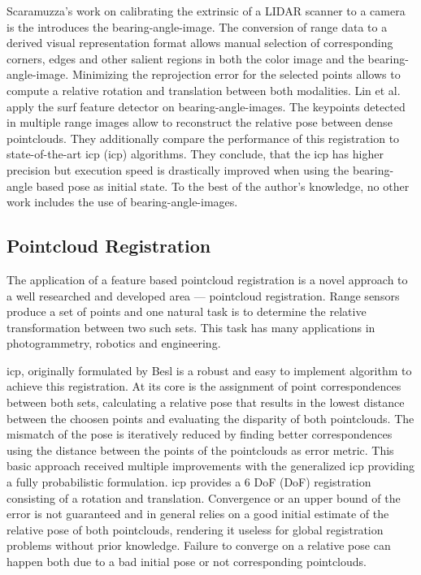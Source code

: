Scaramuzza's\cite{scaramuzza_iros2007} work on calibrating the extrinsic of a \acrshort{LIDAR} scanner to a camera is the introduces the \gls{bearing-angle-image}.
The conversion of range data to a derived visual representation format allows manual selection of corresponding corners, edges and other salient regions in both the color image and the \gls{bearing-angle-image}.
Minimizing the reprojection error for the selected points allows to compute a relative rotation and translation between both modalities.
Lin et al.\cite{lin_easp2017} apply the \acrshort{surf}\cite{bay_eccv06} feature detector on \glspl{bearing-angle-image}.
The keypoints detected in multiple range images allow to reconstruct the relative pose between dense pointclouds.
They additionally compare the performance of this registration to state-of-the-art \acrshort{icp} (\acrlong{icp}) algorithms.
They conclude, that the \acrshort{icp} has higher precision but execution speed is drastically improved when using the \gls{bearing-angle} based pose as initial state.
To the best of the author's knowledge, no other work includes the use of \glspl{bearing-angle-image}.

\subsection{Pointcloud Registration}

The application of a feature based pointcloud registration is a novel approach to a well researched and developed area --- pointcloud registration.
Range sensors produce a set of points and one natural task is to determine the relative transformation between two such sets.
This task has many applications in photogrammetry, robotics and engineering.

\acrshort{icp}, originally formulated by Besl\cite{besl_pami1992} is a robust and easy to implement algorithm to achieve this registration.
At its core is the assignment of point correspondences between both sets, calculating a relative pose that results in the lowest distance between the choosen points and evaluating the disparity of both pointclouds.
The mismatch of the pose is iteratively reduced by finding better correspondences using the distance between the points of the pointclouds as error metric.
This basic approach received multiple improvements with the generalized \acrshort{icp}\cite{segal_2009,korn_2014} providing a fully probabilistic formulation.
\acrshort{icp} provides a 6 \acrlong{DoF} (\acrshort{DoF}) registration consisting of a rotation and translation.
Convergence or an upper bound of the error is not guaranteed and in general relies on a good initial estimate of the relative pose of both pointclouds, rendering it useless for global registration problems without prior knowledge.
Failure to converge on a relative pose can happen both due to a bad initial pose or not corresponding pointclouds.

